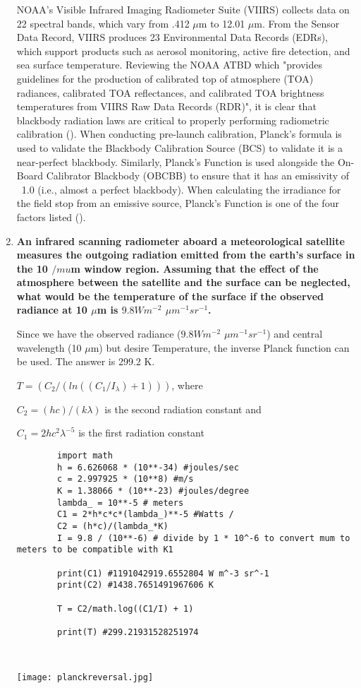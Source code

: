 \documentclass[12pt, letterpaper]{article}
\begin{document}
\begin{enumerate}
    \bigskip
    NOAA's Visible Infrared Imaging Radiometer Suite (VIIRS) collects data on 22 spectral bands, which vary from .412 $\mu$m to 12.01 $\mu$m. From the Sensor Data Record, VIIRS produces 23 Environmental Data Records (EDRs), which support products such as aerosol monitoring, active fire detection, and sea surface temperature. Reviewing the NOAA ATBD which "provides guidelines for the production of calibrated top of atmosphere (TOA) radiances, calibrated TOA reflectances, and calibrated TOA brightness temperatures from VIIRS Raw Data Records (RDR)", it is clear that blackbody radiation laws are critical to properly performing radiometric calibration (\cite{noaa_atbd}). When conducting pre-launch calibration, Planck's formula is used to validate the Blackbody Calibration Source (BCS) to validate it is a near-perfect blackbody. Similarly, Planck's Function is used alongside the On-Board Calibrator Blackbody (OBCBB) to ensure that it has an emissivity of ~1.0 (i.e., almost a perfect blackbody). When calculating the irradiance for the field stop from an emissive source, Planck's Function is one of the four factors listed (\cite{noaa_atbd}). 


    \item \textbf{An infrared scanning radiometer aboard a meteorological satellite measures the outgoing radiation emitted from the earth's surface in the 10 $/mu$m window region. Assuming that the effect of the atmosphere between the satellite and the surface can be neglected, what would be the temperature of the surface if the observed radiance at 10 $\mu$m is \(9.8 W m^{-2}\) $\mu$\(m^{-1} sr^{-1}\).} 
    
    Since we have the observed radiance (\(9.8 W m^{-2}\) $\mu$\(m^{-1} sr^{-1}\)) and central wavelength (10 $\mu$m) but desire Temperature, the inverse Planck function can be used. The answer is 299.2 K.

    \( T = (C_2/(ln((C_1/I_{\lambda})+1)))\), where

    \( C_2 = (hc)/(k\lambda)\) is the second radiation constant and

    \( C_1 = 2hc^2\lambda^{-5}\) is the first radiation constant

    \begin{lstlisting}
        import math
        h = 6.626068 * (10**-34) #joules/sec
        c = 2.997925 * (10**8) #m/s
        K = 1.38066 * (10**-23) #joules/degree
        lambda_ = 10**-5 # meters
        C1 = 2*h*c*c*(lambda_)**-5 #Watts / 
        C2 = (h*c)/(lambda_*K)
        I = 9.8 / (10**-6) # divide by 1 * 10^-6 to convert mum to meters to be compatible with K1
        
        print(C1) #1191042919.6552804 W m^-3 sr^-1
        print(C2) #1438.7651491967606 K
        
        T = C2/math.log((C1/I) + 1)
        
        print(T) #299.21931528251974
        
        
    \end{lstlisting}

    \texttt{[image: planckreversal.jpg]}

\end{enumerate}
\pagebreak


\end{document}
